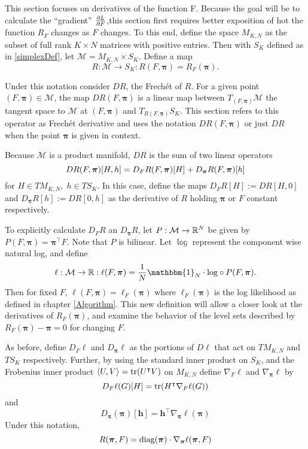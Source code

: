 \label{sect:dRdPiANDdRdF}
This section focuses on derivatives of the function \Rpi F. Because the goal will be to calculate the ``gradient'' \( \pdv{L}{F} \),this section first requires better exposition of hot the function \( R_F \) changes as \( F \) changes. To this end, define the space $M_{K,N}$ as the subset of full rank $K\times N$ matrices with positive entries.  Then with $S_K$ defined as in \ref{simplexDef}, let $\mathcal{M}=M_{K,N}\times S_K$. Define a map
\begin{equation}\label{manifoldResp}
R:\mathcal{M}\rightarrow S_K:R(F,\bm\pi) = R_F(\bm\pi).
\end{equation}

Under this notation consider $DR$, the Frech\'et of $R$.  For a given point $(F,\bm\pi)\in \mathcal{M}$, the map $DR(F,\bm\pi)$ is a linear map between $T_{(F,\bm\pi)}\mathcal{M}$ the tangent space to $\mathcal{M}$ at $(F,\bm\pi)$ and $T_{R(F,\bm\pi)}S_K$.  This section refers to this operator as Frech\'et derivative and uses the notation $DR(F,\bm\pi)$ or just $DR$ when the point \( \bm\pi \) is given in context.

Because $\mathcal{M}$ is a product manifold, $DR$ is the sum of two linear operators
\begin{equation*}
DR(F,\bm\pi)[H,h] = D_FR(F,\bm\pi)[H] + D_{\bm\pi}R(F,\bm\pi)[h]  \\
\end{equation*}
for \( H\in TM_{K,N},\; h\in TS_K\). In this case, define the maps $D_FR[H]:=DR[H,0]$ and $D_{\bm\pi}R[h]:=DR[0,h]$ as the derivative of $R$ holding $\bm\pi$ or $F$ constant respectively.

To explicitly calculate \( D_FR \) an \( D_{\bm\pi}R \), let $P:\mathcal{M}\rightarrow \mathbb R^{N}$ be given by $P(F,\bm\pi)=\bm\pi^{\intercal}F$.  Note that $P$ is bilinear. Let $\mathbb{\log}$ represent the component wise natural log, and define 
\[\ell:\mathcal{M}\rightarrow \R:\ell(F,\bm\pi)=\frac{1}{N}\mathbbm{1}_N\cdot\mathbb{\log}\circ P(F,\bm\pi).\]
Then for fixed $F$, $\ell(F,\bm\pi)=\ell_F(\bm\pi)$ where $\ell_F(\bm\pi)$ is the log likelihood as defined in chapter \ref{Algorithm}.  This new definition will allow a closer look at the derivatives of $R_F(\bm\pi)$, and examine the behavior of the level sets described by $R_F(\bm\pi)-\bm\pi=0$ for changing $F$.

As before, define $D_F\ell$ and $D_{\bm\pi}\ell$ as the portions of $D\ell$ that act on $TM_{K,N}$ and $TS_K$ respectively.  Further, by using the standard inner product on $S_K$, and the Frobenius inner product $\langle U,V\rangle=\operatorname{tr}(U^{\intercal}V)$ on $M_{K,N}$ define $\nabla_F\ell$ and $\nabla_{\bm\pi}\ell$ by
\[D_F\ell(G)[H]=\operatorname{tr}(H^{\intercal}\nabla_F\ell(G))\]
and
\begin{equation}\label{gradEll}
D_{\bm\pi}(\bm \pi)[\bm h]=\bm h^{\intercal}\nabla_{\bm\pi}\ell(\bm\pi)
\end{equation}
Under this notation, 
\begin{equation}\label{rGradDef}
R(\bm\pi,F)=\operatorname{diag}(\bm\pi)\cdot\nabla_{\bm\pi}\ell(\bm\pi,F)
\end{equation}

